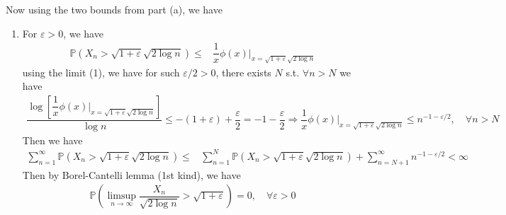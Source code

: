 \documentclass[11pt,a4paper]{article}
\numberwithin{equation}{section}%
\begin{document}
Now using the two bounds from part (a), we have
\begin{enumerate}[topsep=2pt,itemsep=2pt]
    \item For $ \varepsilon >0 $, we have
    \begin{align*}
        \mathbb{P}\left( X_n> \sqrt{1+\varepsilon }\sqrt{2\log n} \right) \leq &  \dfrac{ 1 }{ x }\phi(x) \Big|_{x=\sqrt{1+\varepsilon }\sqrt{2\log n}} 
    \end{align*}
    using the limit (1), we have for such $ \varepsilon /2 >0 $, there exists $ N $ s.t. $ \forall n>N $ we have
    \begin{align*}
        \dfrac{ \log \left[ \dfrac{ 1 }{ x }\phi(x) \Big|_{x=\sqrt{1+\varepsilon }\sqrt{2\log n}} \right] }{ \log n } \leq -(1+\varepsilon )+\dfrac{ \varepsilon  }{ 2 } = -1-\dfrac{ \varepsilon  }{ 2 } \Rightarrow \dfrac{ 1 }{ x }\phi(x) \Big|_{x=\sqrt{1+\varepsilon }\sqrt{2\log n}} \leq n^{-1-\varepsilon /2} ,\quad \forall n>N
    \end{align*}
    Then we have
    \begin{align*}
        \sum_{n=1}^\infty  \mathbb{P}\left( X_n> \sqrt{1+\varepsilon }\sqrt{2\log n} \right) \leq & \sum_{n=1}^N  \mathbb{P}\left( X_n> \sqrt{1+\varepsilon }\sqrt{2\log n} \right) + \sum_{n=N+1}^\infty n^{-1-\varepsilon /2} < \infty
    \end{align*}
    Then by Borel-Cantelli lemma (1st kind), we have
    \begin{align*}
        \mathbb{P}\left( \limsup _{n\to\infty }\dfrac{ X_n }{ \sqrt{2\log n}  }> \sqrt{1+\varepsilon }   \right) = 0 ,\quad \forall \varepsilon >0
    \end{align*}
    


\end{enumerate}
\end{document}
